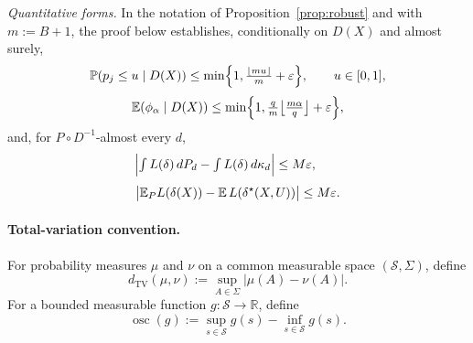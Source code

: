 \emph{Quantitative forms.} In the notation of
Proposition~\ref{prop:robust} and with $m:=B+1$, the proof below
establishes, conditionally on $D(X)$ and almost surely,
\begin{equation}
\label{eq:robust-marginal-p}
\mathbb{P}(p_j\le u\mid D(X))
\le\min\Bigl\{1,\tfrac{\lfloor mu\rfloor}{m}+\varepsilon\Bigr\},
\qquad u\in[0,1],
\end{equation}
\begin{equation}
\label{eq:robust-bonferroni}
\mathbb{E}(\phi_\alpha\mid D(X))
\le\min\Bigl\{1,\tfrac{q}{m}\bigl\lfloor\tfrac{m\alpha}{q}\bigr\rfloor+\varepsilon\Bigr\},
\end{equation}
and, for $P\circ D^{-1}$-almost every $d$,
\begin{equation}
\label{eq:robust-conditional-risk}
\Bigl|\textstyle\int L(\delta)\,dP_d-\int L(\delta)\,d\kappa_d\Bigr|
\le M\varepsilon,
\qquad
\end{equation}
\begin{equation}
\label{eq:robust-unconditional-risk}
\bigl|\mathbb{E}_P L(\delta(X))-\mathbb{E}\,L(\delta^{\star}(X,U))\bigr|\le M\varepsilon.
\end{equation}


\paragraph{Total-variation convention.}
For probability measures \(\mu\) and \(\nu\) on a common measurable
space \((\mathcal S,\Sigma)\), define
\[
d_{\mathrm{TV}}(\mu,\nu)
:=
\sup_{A\in\Sigma}|\mu(A)-\nu(A)|.
\]
For a bounded measurable function \(g:\mathcal S\to\mathbb R\), define
\[
\operatorname{osc}(g)
:=
\sup_{s\in\mathcal S}g(s)
-
\inf_{s\in\mathcal S}g(s).
\]

